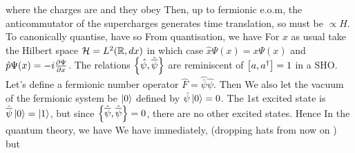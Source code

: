 \documentclass{article}
\begin{document}
where the charges are 
and they obey
Then, up to fermionic e.o.m, the anticommutator of the supercharges generates time translation, so must be $\propto H$. \\
To canonically quantise, have 
so 
From quantisation, we have 
For $x$ as usual take the Hilbert space $\mc{H} = L^2 ( \mbb{R}, dx)$ in which case $\hat{x} \Psi(x) = x\Psi(x)$ and $\hat{p} \Psi(x) = -i \pd[\Psi]{x}$. The relations $\acomm[\hat{\psi}]{\hat{\bar{\psi}}}$ are reminiscent of $\comm[a]{a^\dagger}=1$ in a SHO. Let's define a fermionic number operator $\hat{F} = \hat{\bar{\psi}}\hat{\psi}$. Then 
\eq{
\comm[\hat{F}]{\hat{\psi}} &= -\hat{\psi} \\
\comm[\hat{F}]{\hat{\bar{\psi}}} &= \hat{\bar{\psi}}
}
We also let the vacuum of the fermionic system be $\ket{0}$ defined by $\hat{\psi}\ket{0}=0$. The 1st excited state is $\hat{\bar{\psi}}\ket{0} = \ket{1}$, but since $\acomm[\hat{\bar{\psi}}]{\hat{\bar{\psi}}}=0$, there are no other excited states. Hence 
In the quantum theory, we have 
We have immediately, (dropping hats from now on )
but 
\end{document}
